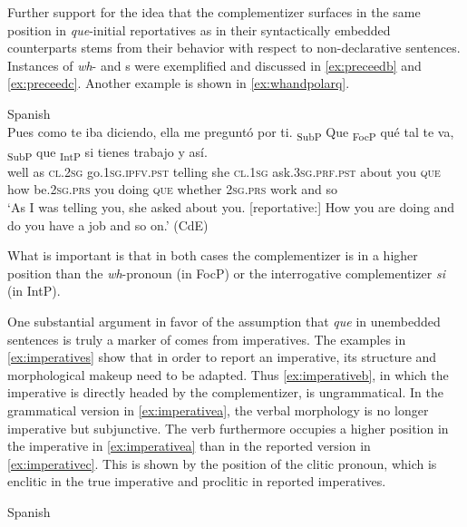 Further support for the idea that the complementizer surfaces in the same position in \emph{que}-initial reportatives as in their syntactically embedded counterparts stems from their behavior with respect to non-declarative sentences. Instances of \textit{wh}- and s were exemplified and discussed  in \eqref{ex:preceedb} and \eqref{ex:preceedc}. Another example is shown in \eqref{ex:whandpolarq}.

\ea\label{ex:whandpolarq}
 Spanish\\ 
\gll Pues como te iba diciendo, ella me preguntó por ti. {\ob}\textsubscript{SubP} Que{\cb} {\ob}\textsubscript{FocP} {qué{\cb} tal te va},  {\ob}\textsubscript{SubP} que{\cb} {\ob}\textsubscript{IntP} si{\cb} tienes trabajo y así. \\ 
well as \textsc{cl.2sg} go.\textsc{1sg.ipfv.pst} telling she \textsc{cl.1sg} ask.\textsc{3sg.prf.pst} about you  {} \textsc{que} {} {how be.\textsc{2sg.prs} you doing} {} \textsc{que} {} whether \textsc{2sg.prs} work and so\\
\glt `As I was telling you, she asked about you. [reportative:] How you are doing and do you have a job and so on.' (CdE)
\z



 What is important is that in both cases  the complementizer is in a higher position than the \textit{wh}-pronoun (in FocP)  or the interrogative complementizer \emph{si} (in IntP). 
 




One substantial argument in favor of the assumption that \emph{que} in unembedded sentences is truly a marker of   comes from imperatives. 
The examples in \eqref{ex:imperatives} show that in order to report an imperative, its structure and morphological makeup need to be adapted. Thus \eqref{ex:imperativeb}, in which the imperative is directly headed by the  complementizer, is ungrammatical. In the grammatical version in \eqref{ex:imperativea}, the verbal morphology is no longer imperative but subjunctive. The verb furthermore occupies a higher position in the imperative in \eqref{ex:imperativea} than in the reported version in \eqref{ex:imperativec}. This is shown by the position of the clitic pronoun, which is enclitic in the true imperative and proclitic in  reported imperatives.\largerpage

\ea\label{ex:imperatives}Spanish
\z
\z

